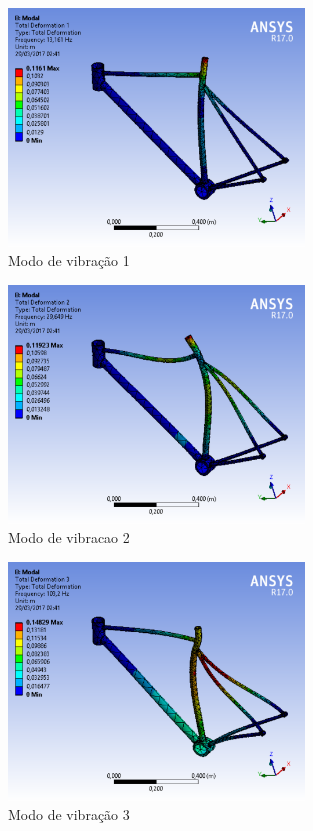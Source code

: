 \graphicspath{{figuras/}}
	\begin{figure}[h!]
	\centering
	\includegraphics[width=0.7\textwidth]{modo_de_vibracao.png}
	\caption{Modo de vibração 1}
	\label{img:modo_de_vibracao}
	\end{figure}	
	
\graphicspath{{figuras/}}
	\begin{figure}[h!]
	\centering
	\includegraphics[width=0.7\textwidth]{modo_de_vibracao_2.png}
	\caption{Modo de vibracao 2}
	\label{img:modo_de_vibracao2}
	\end{figure}	
	
\graphicspath{{figuras/}}
	\begin{figure}[h!]
	\centering
	\includegraphics[width=0.7\textwidth]{modo_de_vibracao_3.png}
	\caption{Modo de vibração 3}
	\label{img:modo_de_vibracao3}
	\end{figure}	
	
